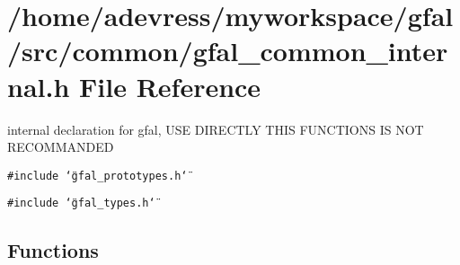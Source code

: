 \section{/home/adevress/myworkspace/gfal/src/common/gfal\_\-common\_\-internal.h File Reference}
\label{gfal__common__internal_8h}
internal declaration for gfal, USE DIRECTLY THIS FUNCTIONS IS NOT RECOMMANDED 

{\tt \#include \char`\"{}gfal\_\-prototypes.h\char`\"{}}\par
{\tt \#include \char`\"{}gfal\_\-types.h\char`\"{}}\par
\subsection*{Functions}
